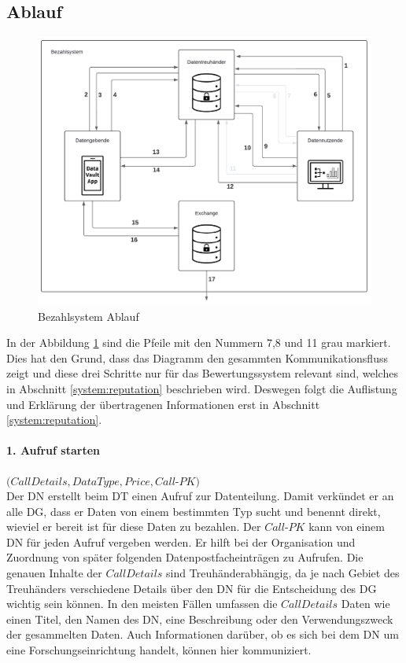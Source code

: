 \documentclass[
	fontsize=11pt,
	headings=small,
	parskip=half,           %
	bibliography=totoc,
	numbers=noenddot,       %
	open=any,               %
]{scrreprt}
\begin{document}
\subsection{Ablauf}
\begin{figure}[H]
    \centering
    \includegraphics[width=0.9\linewidth]{PaymentDiagramm.pdf}
    \caption{Bezahlsystem Ablauf}
    \label{fig:payment}
\end{figure} 

In der Abbildung \ref{fig:payment} sind die Pfeile mit den Nummern 7,8 und 11 grau markiert. Dies hat den Grund, dass das Diagramm den gesammten Kommunikationsfluss zeigt und diese drei Schritte nur für das Bewertungssystem relevant sind, welches in Abschnitt \ref{system:reputation} beschrieben wird. Deswegen folgt die Auflistung und Erklärung der übertragenen Informationen erst in Abschnitt \ref{system:reputation}.

\paragraph{1. Aufruf starten} $(CallDetails, DataType, Price, Call$-$PK)$\\
Der DN erstellt beim DT einen Aufruf zur Datenteilung. Damit verkündet er an alle DG, dass er Daten von einem bestimmten Typ sucht und benennt direkt, wieviel er bereit ist für diese Daten zu bezahlen. Der $Call$-$PK$ kann von einem DN für jeden Aufruf vergeben werden. Er hilft bei der Organisation und Zuordnung von später folgenden Datenpostfacheinträgen zu Aufrufen. Die genauen Inhalte der $CallDetails$ sind Treuhänderabhängig, da je nach Gebiet des Treuhänders verschiedene Details über den DN für die Entscheidung des DG wichtig sein können. In den meisten Fällen umfassen die $CallDetails$ Daten wie einen Titel, den Namen des DN, eine Beschreibung oder den Verwendungszweck der gesammelten Daten. Auch Informationen darüber, ob es sich bei dem DN um eine Forschungseinrichtung handelt, können hier kommuniziert.
\end{document}
